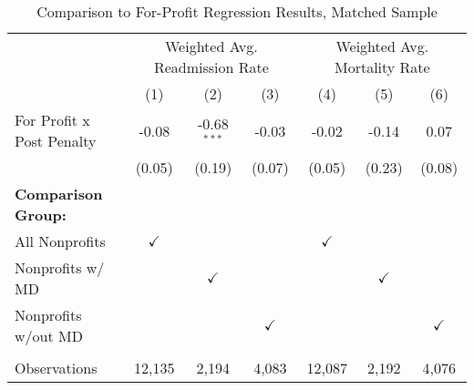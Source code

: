 \begin{table}[htbp]
   \caption{\label{tab:forprofit_matchsample} Comparison to For-Profit Regression Results, Matched Sample}
   \bigskip
   \centering
   \begin{tabular}{lcccccc}
      \toprule
       & \multicolumn{3}{c}{Weighted Avg. Readmission Rate} & \multicolumn{3}{c}{Weighted Avg. Mortality Rate}\\
                                  & (1)           & (2)           & (3)           & (4)           & (5)           & (6)\\  
      \midrule 
      For Profit x Post Penalty   & -0.08         & -0.68$^{***}$ & -0.03         & -0.02         & -0.14         & 0.07\\   
                                  & (0.05)        & (0.19)        & (0.07)        & (0.05)        & (0.23)        & (0.08)\\   
      \textbf{Comparison Group:}  &               &               &               &               &               & \\  
      All Nonprofits              & $\checkmark$  &               &               & $\checkmark$  &               & \\  
      Nonprofits w/ MD            &               & $\checkmark$  &               &               & $\checkmark$  & \\  
      Nonprofits w/out MD         &               &               & $\checkmark$  &               &               & $\checkmark$\\   
       \\
      Observations                & 12,135        & 2,194         & 4,083         & 12,087        & 2,192         & 4,076\\  
      \bottomrule
   \end{tabular}
\end{table}
